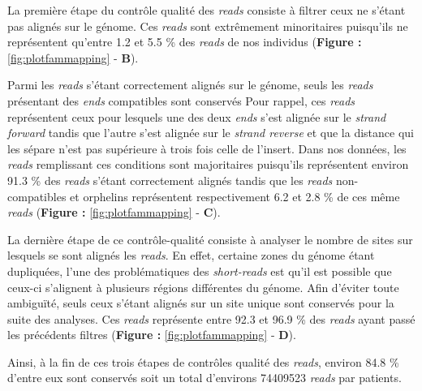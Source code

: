 \documentclass[12pt,twoside]{ugathesis}
\begin{document}
La première étape du contrôle qualité des \emph{reads} consiste à
filtrer ceux ne s'étant pas alignés sur le génome. Ces \emph{reads} sont
extrêmement minoritaires puisqu'ils ne représentent qu'entre 1.2 et 5.5
\% des \emph{reads} de nos individus (\textbf{Figure :
}\ref{fig:plotfammapping} - \textbf{B}).

Parmi les \emph{reads} s'étant correctement alignés sur le génome, seuls
les \emph{reads} présentant des \emph{ends} compatibles sont conservés
Pour rappel, ces \emph{reads} représentent ceux pour lesquels une des
deux \emph{ends} s'est alignée sur le \emph{strand forward} tandis que
l'autre s'est alignée sur le \emph{strand reverse} et que la distance
qui les sépare n'est pas supérieure à trois fois celle de l'insert. Dans
nos données, les \emph{reads} remplissant ces conditions sont
majoritaires puisqu'ils représentent environ 91.3 \% des \emph{reads}
s'étant correctement alignés tandis que les \emph{reads} non-compatibles
et orphelins représentent respectivement 6.2 et 2.8 \% de ces même
\emph{reads} (\textbf{Figure : }\ref{fig:plotfammapping} - \textbf{C}).

La dernière étape de ce contrôle-qualité consiste à analyser le nombre
de sites sur lesquels se sont alignés les \emph{reads}. En effet,
certaine zones du génome étant dupliquées, l'une des problématiques des
\emph{short-reads} est qu'il est possible que ceux-ci s'alignent à
plusieurs régions différentes du génome. Afin d'éviter toute ambiguïté,
seuls ceux s'étant alignés sur un site unique sont conservés pour la
suite des analyses. Ces \emph{reads} représente entre 92.3 et 96.9 \%
des \emph{reads} ayant passé les précédents filtres (\textbf{Figure :
}\ref{fig:plotfammapping} - \textbf{D}).

Ainsi, à la fin de ces trois étapes de contrôles qualité des
\emph{reads}, environ 84.8 \% d'entre eux sont conservés soit un total
d'environs 74409523 \emph{reads} par patients.

\newpage 
\end{document}
